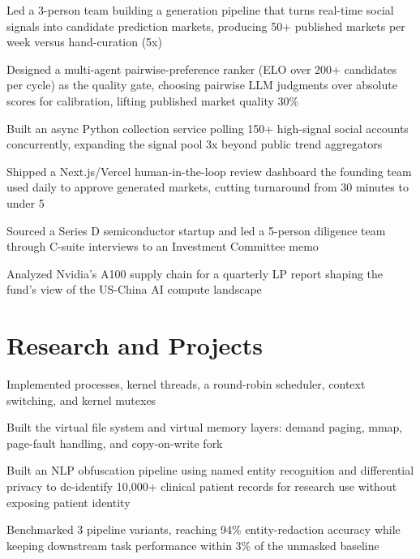 \documentclass[10pt]{article}
\begin{document}
\begin{bullets}
  \item Led a 3-person team building a generation pipeline that turns real-time social signals into candidate prediction markets, producing 50+ published markets per week versus hand-curation (5x)
  \item Designed a multi-agent pairwise-preference ranker (ELO over 200+ candidates per cycle) as the quality gate, choosing pairwise LLM judgments over absolute scores for calibration, lifting published market quality 30\%
  \item Built an async Python collection service polling 150+ high-signal social accounts concurrently, expanding the signal pool 3x beyond public trend aggregators
  \item Shipped a Next.js/Vercel human-in-the-loop review dashboard the founding team used daily to approve generated markets, cutting turnaround from 30 minutes to under 5
\end{bullets}

\begin{bullets}
  \item Sourced a Series D semiconductor startup and led a 5-person diligence team through C-suite interviews to an Investment Committee memo
  \item Analyzed Nvidia's A100 supply chain for a quarterly LP report shaping the fund's view of the US-China AI compute landscape
\end{bullets}

\section{Research and Projects}
\begin{bullets}
  \item Implemented processes, kernel threads, a round-robin scheduler, context switching, and kernel mutexes
  \item Built the virtual file system and virtual memory layers: demand paging, mmap, page-fault handling, and copy-on-write fork
\end{bullets}

\begin{bullets}
  \item Built an NLP obfuscation pipeline using named entity recognition and differential privacy to de-identify 10,000+ clinical patient records for research use without exposing patient identity
  \item Benchmarked 3 pipeline variants, reaching 94\% entity-redaction accuracy while keeping downstream task performance within 3\% of the unmasked baseline
\end{bullets}
\end{document}
